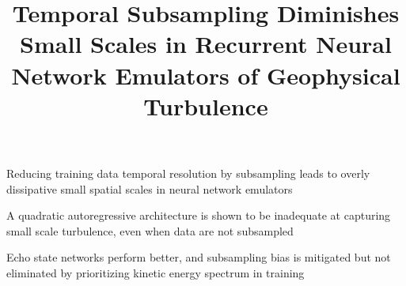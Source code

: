 \documentclass[draft]{agujournal2019}
\begin{document}
\title{Temporal Subsampling Diminishes Small Scales in
    Recurrent Neural Network Emulators of
    Geophysical Turbulence}

%
%




\begin{keypoints}
    \item Reducing training data temporal resolution by subsampling leads to
        overly dissipative small spatial scales in neural network
        emulators
    \item A quadratic autoregressive architecture is shown to be inadequate at capturing
        small scale turbulence, even when data are not subsampled
    \item Echo state networks perform better, and subsampling bias is mitigated
        but not eliminated by prioritizing kinetic energy spectrum in training
\end{keypoints}

%
%
\end{document}
